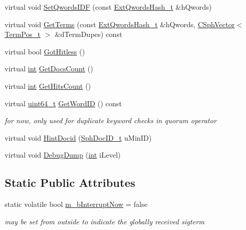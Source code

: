 \begin{DoxyCompactItemize}
\item 
virtual void \hyperlink{classExtTerm__c_ac5bc0fbec18a611cceeb6a076b01516c}{Set\-Qwords\-I\-D\-F} (const \hyperlink{sphinxsearch_8cpp_a814fc096e1ffb29d072d79b72b702fe6}{Ext\-Qwords\-Hash\-\_\-t} \&h\-Qwords)
\item 
virtual void \hyperlink{classExtTerm__c_a99ffcd9d7b4c2933ae483f872f2ea8e2}{Get\-Terms} (const \hyperlink{sphinxsearch_8cpp_a814fc096e1ffb29d072d79b72b702fe6}{Ext\-Qwords\-Hash\-\_\-t} \&h\-Qwords, \hyperlink{classCSphVector}{C\-Sph\-Vector}$<$ \hyperlink{structTermPos__t}{Term\-Pos\-\_\-t} $>$ \&d\-Term\-Dupes) const 
\item 
virtual bool \hyperlink{classExtTerm__c_a5a384fadf826a38e4072f77295acadf5}{Got\-Hitless} ()
\item 
virtual \hyperlink{sphinxexpr_8cpp_a4a26e8f9cb8b736e0c4cbf4d16de985e}{int} \hyperlink{classExtTerm__c_aeeb751b24e6c62b8f1daf3ba593a5810}{Get\-Docs\-Count} ()
\item 
virtual \hyperlink{sphinxexpr_8cpp_a4a26e8f9cb8b736e0c4cbf4d16de985e}{int} \hyperlink{classExtTerm__c_a181e3779ed6d217744f179d94c008965}{Get\-Hits\-Count} ()
\item 
virtual \hyperlink{sphinxstd_8h_aaa5d1cd013383c889537491c3cfd9aad}{uint64\-\_\-t} \hyperlink{classExtTerm__c_a280cf0cbb98e25963ff71538d00bd106}{Get\-Word\-I\-D} () const 
\begin{DoxyCompactList}\small\item\em for now, only used for duplicate keyword checks in quorum operator \end{DoxyCompactList}\item 
virtual void \hyperlink{classExtTerm__c_a5cd5248cb234d925bd07588cfa0e96e8}{Hint\-Docid} (\hyperlink{sphinx_8h_a3176771631c12a9e4897272003e6b447}{Sph\-Doc\-I\-D\-\_\-t} u\-Min\-I\-D)
\item 
virtual void \hyperlink{classExtTerm__c_a3dc266a354dc16f7f2dbf2342e666123}{Debug\-Dump} (\hyperlink{sphinxexpr_8cpp_a4a26e8f9cb8b736e0c4cbf4d16de985e}{int} i\-Level)
\end{DoxyCompactItemize}
\subsection*{Static Public Attributes}
\begin{DoxyCompactItemize}
\item 
static volatile bool \hyperlink{classExtTerm__c_a88e26f2dd6f780dd04170b56ea66bec2}{m\-\_\-b\-Interrupt\-Now} = false
\begin{DoxyCompactList}\small\item\em may be set from outside to indicate the globally received sigterm \end{DoxyCompactList}\end{DoxyCompactItemize}
